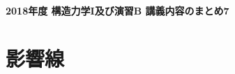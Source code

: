 \documentclass[10pt,a4j]{jarticle}
\newlength{\minitwocolumn}
\begin{document}
\newcommand{\fat}[1]{\mbox{\boldmath $#1$}}
\newcommand{\D}{\partial}
\newcommand{\w}{\omega}
\newcommand{\ga}{\alpha}
\newcommand{\gb}{\beta}
\newcommand{\gx}{\xi}
\newcommand{\gz}{\zeta}
\newcommand{\vhat}[1]{\hat{\fat{#1}}}
\newcommand{\spc}{\vspace{0.7\baselineskip}}
\newcommand{\halfspc}{\vspace{0.3\baselineskip}}

\newcommand{\twofig}[2]
 {
   \begin{figure}
     \begin{minipage}[t]{\minitwocolumn}
         \begin{center}   #1
         \end{center}
     \end{minipage}
         \hspace{\columnsep}
     \begin{minipage}[t]{\minitwocolumn}
         \begin{center} #2
         \end{center}
     \end{minipage}
   \end{figure}
 }
\begin{center}
	{\Large \bf 2018年度 構造力学I及び演習B 講義内容のまとめ7} \\
\end{center}
\section{影響線}
\end{document}
